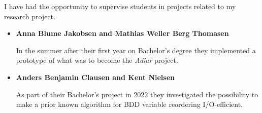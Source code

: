 
I have had the opportunity to supervise students in projects related to my research
project.

\medskip

\begin{itemize}
\item \textbf{Anna Blume Jakobsen and Mathias Weller Berg Thomasen}

  In the summer after their first year on Bachelor's degree they implemented a
  prototype of what was to become the \emph{Adiar} project.

\item \textbf{Anders Benjamin Clausen and Kent Nielsen}

  As part of their Bachelor's project in 2022 they investigated the possibility to 
  make a prior known algorithm for BDD variable reordering I/O-efficient.
\end{itemize}
